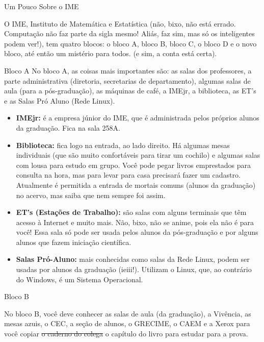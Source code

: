 \begin{secao}{Um Pouco Sobre o IME}

O IME, Instituto de Matemática e Estatística (não, bixo, não está errado.
Computação não faz parte da sigla mesmo! Aliás, faz sim, mas só os inteligentes
podem ver!), tem quatro blocos: o bloco A, bloco B, bloco C, o bloco D e o novo bloco, até então um mistério para todos. (e sim, a conta está certa).

\begin{subsecao}{Bloco A}
No bloco A, as coisas mais importantes são: as salas dos professores, a parte
administrativa (diretoria, secretarias de departamento), algumas salas de aula
(para a pós-graduação), as máquinas de café, a IMEjr, a biblioteca, as ET's e
as Salas Pró Aluno (Rede Linux).

\begin{itemize}

\item {\bf IMEjr:} é a empresa júnior do IME, que é administrada pelos próprios
alunos da graduação. Fica na sala 258A.

\item {\bf Biblioteca:} fica logo na entrada, ao lado direito. Há algumas mesas
individuais (que são muito confortáveis para tirar um cochilo) e algumas salas
com lousa para estudo em grupo. Você pode pegar livros emprestados para consulta
na hora, mas para levar para casa precisará fazer um cadastro. Atualmente é
permitida a entrada de mortais comuns (alunos da graduação) no acervo, mas saiba
que nem sempre foi assim.

\item {\bf ET's (Estações de Trabalho):} são salas com alguns terminais que têm
acesso à Internet e muito mais. Não, bixo, não se anime, pois ela não é para
você! Essa sala só pode ser usada pelos alunos da pós-graduação e por alguns
alunos que fazem iniciação científica.

\item {\bf Salas Pró-Aluno:} mais conhecidas como salas da Rede Linux, podem ser
usadas por alunos da graduação (ieiii!). Utilizam o Linux, que, ao contrário do
Windows, é um Sistema Operacional.

\end{itemize}
\end{subsecao}

\begin{subsecao}{Bloco B}

No bloco B, você deve conhecer as salas de aula (da graduação), a Vivência, as
mesas azuis, o CEC, a seção de alunos, o GRECIME, o CAEM e a Xerox para você
copiar \sout{o caderno do colega} o capítulo do livro para estudar para a prova.


\end{subsecao}
\end{secao}
